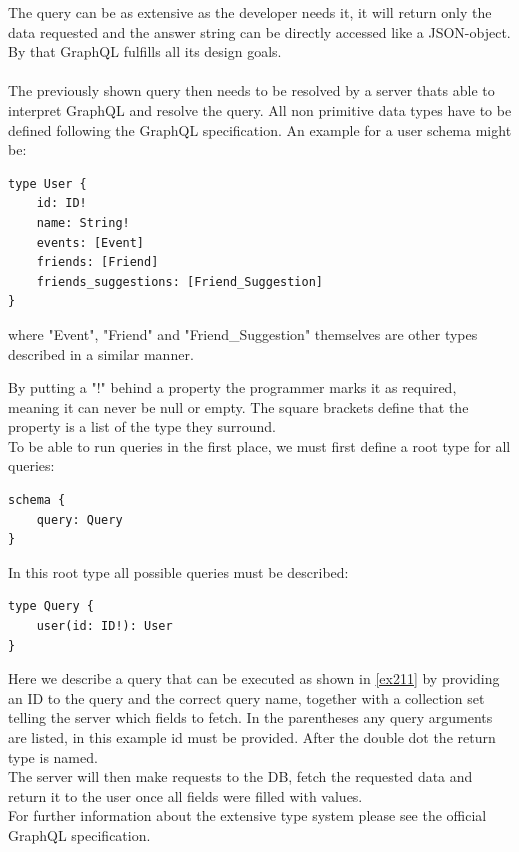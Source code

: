 The query can be as extensive as the developer needs it, it will return only the data requested and the answer string can be directly accessed like a JSON-object. By that GraphQL fulfills all its design goals.
\\ \\
The previously shown query then needs to be resolved by a server thats able to interpret GraphQL and resolve the query. All non primitive data types have to be defined following the GraphQL specification. An example for a user schema might be:

\begin{lstlisting}[caption={Type Definition in GraphQL}]
type User {
	id: ID! 
	name: String! 
	events: [Event] 
	friends: [Friend] 
	friends_suggestions: [Friend_Suggestion] 
}
\end{lstlisting}

\noindent
where "Event", "Friend" and "Friend\_Suggestion" themselves are other types described in a similar manner.

By putting a "!" behind a property the programmer marks it as required, meaning it can never be null or empty. The square brackets define that the property is a list of the type they surround.
\\
To be able to run queries in the first place, we must first define a root type for all queries:

\begin{lstlisting}[caption={Root Type Definition}]
schema {
	query: Query
}
\end{lstlisting}

In this root type all possible queries must be described:

\begin{lstlisting}[caption={Defining Queries}]
type Query { 
	user(id: ID!): User 
}
\end{lstlisting}

Here we describe a query that can be executed as shown in \autoref{ex211} by providing an ID to the query and the correct query name, together with a collection set telling the server which fields to fetch. In the parentheses any query arguments are listed, in this example id must be provided. After the double dot the return type is named. 
\\
The server will then make requests to the DB, fetch the requested data and return it to the user once all fields were filled with values.
\\
For further information about the extensive type system please see the official GraphQL specification. \cite{GraphQLSpec}

